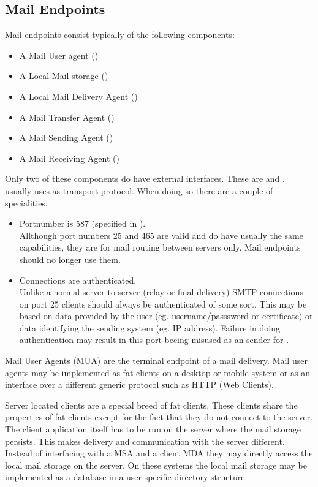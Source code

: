 \subsection{Mail Endpoints}
Mail endpoints consist typically of the following components:
\begin{itemize}
\item A Mail User agent ()
\item A Local Mail storage ()
\item A Local Mail Delivery Agent ()
\item A Mail Transfer Agent ()
\item A Mail Sending Agent ()
\item A Mail Receiving Agent ()
\end{itemize}

Only two of these components do have external interfaces. These are  and .  usually uses  as transport protocol. When doing so there are a couple of specialities. 
\begin{itemize}
\item Portnumber is 587 (specified in \cite{RFC4409}).\\
Allthough port numbers 25 and 465 are valid and do have usually the same capabilities, they are for mail routing between servers only. Mail endpoints should no longer use them.
\item Connections are authenticated.\\
Unlike a normal server-to-server (relay or final delivery) SMTP connections on port 25 clients should always be authenticated of some sort. This may be based on data provided by the user (eg. username/passsword or certificate) or data identifying the sending system (eg. IP address)\cite{RFC4409}. Failure in doing authentication may result in this port beeing misused as an sender for .
\end{itemize}

Mail User Agents (MUA) are the terminal endpoint of a mail delivery. Mail user agents may be implemented as fat clients on a desktop or mobile system or as an interface over a different generic protocol such as HTTP (Web Clients). \par

Server located clients are a special breed of fat clients. These clients share the properties of fat clients except for the fact that they do not connect to the server. The client application itself has to be run on the server where the mail storage persists. This makes delivery and communication with the server different. Instead of interfacing with a MSA and a client MDA they may directly access the local mail storage on the server. On these systems the local mail storage may be implemented as a database in a user specific directory structure.

